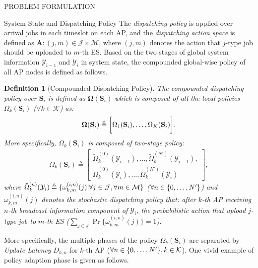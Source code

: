 \documentclass[10pt, conference, letterpaper]{IEEEtran}
\newtheorem{definition}{Definition}
\newcommand{\define}{\triangleq}
\newcommand{\vecG}{\boldsymbol}
\DeclarePairedDelimiter{\set}{\{}{\}}
\DeclarePairedDelimiter{\Bracket}{\bigg[}{\bigg]}
\newcommand{\apSet}{\mathcal{K}}
\newcommand{\esSet}{\mathcal{M}}
\newcommand{\jSpace}{\mathcal{J}}
\newcommand{\Stat}{\mathbf{S}}
\newcommand{\Obsv}{\mathcal{Y}}
\newcommand{\Policy}{\boldsymbol{\Omega}}
\begin{document}
\begin{section}{PROBLEM FORMULATION}
\begin{subsection}{System State and Dispatching Policy}
            The \emph{dispatching policy} is applied over arrival jobs in each timeslot on each AP, and the \emph{dispatching action space} is defined as $\mathbf{A}: (j, m) \in \jSpace \times \esSet$, where $(j, m)$ denotes the action that $j$-type job should be uploaded to $m$-th ES.
            Based on the two stages of global system information $\Obsv_{i-1}$ and $\Obsv_{i}$ in system state, the compounded global-wise policy of all AP nodes is defined as follows.
            \begin{definition}[Compounded Dispatching Policy]
                The compounded dispatching policy over $\Stat_{i}$ is defined as $\Policy(\Stat_{i})$ which is composed of all the local policies $\Omega_k(\Stat_{i})$ ($\forall k\in\apSet$) as:
                \begin{align}
                    \vecG{\Omega}(\Stat_{i}) \define 
                    \Bracket{
                        \Omega_{1}(\Stat_i),
                        \dots,
                        \Omega_{K}(\Stat_i)
                    }.
                \end{align}
                More specifically, $\Omega_k(\Stat_{i})$ is composed of two-stage policy:
                \begin{align}
                    \Omega_k(\Stat_i) \define
                    \begin{bmatrix}
                        \tilde{\Omega}^{(0)}_k(\Obsv_{i-1}), \dots, \tilde{\Omega}^{(N')}_k(\Obsv_{i-1}),
                        \nonumber\\
                        \tilde{\Omega}^{(0)}_k(\Obsv_{i}), \dots, \tilde{\Omega}^{(N')}_k(\Obsv_{i})
                    \end{bmatrix},
                \end{align}
                where $\tilde{\Omega}^{(n)}_k(\Obsv_{i}) \define \set{\omega^{(i,n)}_{k,m}(j)|\forall j\in\jSpace, \forall m\in\esSet}$ ($\forall n\in\set{0,\dots,N'}$) and $\omega^{(i,n)}_{k,m}(j)$ denotes the stochastic dispatching policy that: after $k$-th AP receiving $n$-th broadcast information component of $\Obsv_{i}$, the probabilistic action that upload $j$-type job to $m$-th ES ($\sum_{j\in\jSpace} \Pr\{\omega^{(i,n)}_{k,m}(j)\}=1$).
            \end{definition}
            More specifically, the multiple phases of the policy $\Omega_k(\Stat_i)$ are separated by \emph{Update Latency} $D_{k,n}$ for $k$-th AP ($\forall n\in\set{0,\dots,N'}, k\in\apSet$). One vivid example of policy adaption phase is given as follows.

\end{subsection}
\end{section}
\end{document}
